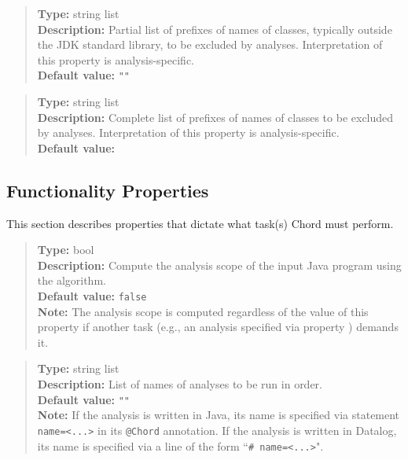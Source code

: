 \begin{quote}
{\bf Type:} string list \\
{\bf Description:} Partial list of prefixes of names of classes, typically outside the JDK standard library, to be excluded by analyses.  Interpretation of this property is analysis-specific. \\
{\bf Default value:} {\tt ""}
\end{quote}

\begin{quote}
{\bf Type:} string list \\
{\bf Description:} Complete list of prefixes of names of classes to be excluded by analyses.  Interpretation of this property is analysis-specific. \\
{\bf Default value:} 
\end{quote}

\subsection{Functionality Properties}
\label{sec:func-props}

This section describes properties that dictate what task(s) Chord must perform.

\begin{quote}
{\bf Type:} bool \\
{\bf Description:} Compute the analysis scope of the input Java program using the algorithm. \\
{\bf Default value:} {\tt false} \\
{\bf Note:} The analysis scope is computed regardless of the value of this property if another task (e.g., an analysis specified via property ) demands it.
\end{quote}

\begin{quote}
{\bf Type:} string list  \\
{\bf Description:} List of names of analyses to be run in order. \\
{\bf Default value:} {\tt ""} \\
{\bf Note:} If the analysis is written in Java, its name is specified via statement {\tt name=<...>} in its {\tt @Chord} annotation.  If the analysis is written in Datalog, its name is specified via a line of the form ``{\tt \# name=<...>}".
\end{quote}

